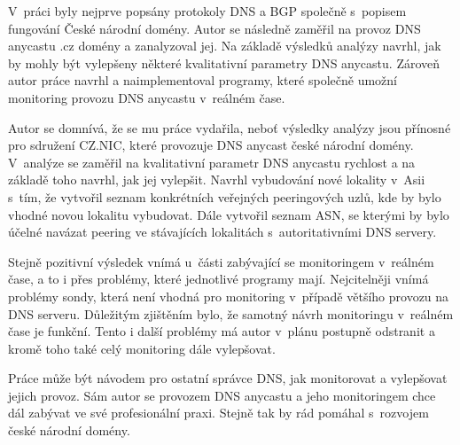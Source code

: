 \documentclass[thesis=M,czech]{src/FITthesis}[2019/12/23]
\begin{document}
\begin{conclusion}
V~práci byly nejprve popsány protokoly DNS a BGP společně s~popisem fungování České národní domény. Autor se následně zaměřil na provoz DNS anycastu .cz domény a zanalyzoval jej. Na základě výsledků analýzy navrhl, jak by mohly být vylepšeny některé kvalitativní parametry DNS anycastu. Zároveň autor práce navrhl a naimplementoval programy, které společně umožní monitoring provozu DNS anycastu v~reálném čase.

Autor se domnívá, že se mu práce vydařila, neboť výsledky analýzy jsou přínosné pro sdružení CZ.NIC, které provozuje DNS anycast české národní domény. V~analýze se zaměřil na kvalitativní parametr DNS anycastu rychlost a na základě toho navrhl, jak jej vylepšit. Navrhl vybudování nové lokality v~Asii s~tím, že vytvořil seznam konkrétních veřejných peeringových uzlů, kde by bylo vhodné novou lokalitu vybudovat. Dále vytvořil seznam ASN, se kterými by bylo účelné navázat peering ve stávajících lokalitách s~autoritativními DNS servery.

Stejně pozitivní výsledek vnímá u~části zabývající se monitoringem \linebreak v~reálném čase, a to i přes problémy, které jednotlivé programy mají. Nejcitelněji vnímá problémy sondy, která není vhodná pro monitoring v~případě většího provozu na DNS serveru. Důležitým zjištěním bylo, že samotný návrh monitoringu v~reálném čase je funkční. Tento i další problémy má autor v~plánu postupně odstranit a kromě toho také celý monitoring dále vylepšovat. 

Práce může být návodem pro ostatní správce DNS, jak monitorovat a vylepšovat jejich provoz. Sám autor se provozem DNS anycastu a jeho monitoringem chce dál zabývat ve své profesionální praxi. Stejně tak by rád pomáhal s~rozvojem české národní domény. 
\end{conclusion}




\appendix
\end{document}
